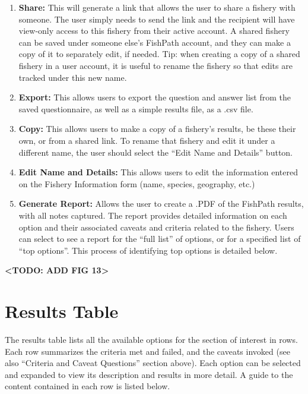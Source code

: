 \documentclass[11pt,]{book}
\providecommand{\tightlist}{%
  \setlength{\itemsep}{0pt}\setlength{\parskip}{0pt}}
\begin{document}
\begin{enumerate}
\def\labelenumi{\arabic{enumi}.}
\tightlist
\item
  \textbf{Share:} This will generate a link that allows the user to share a fishery with someone. The user simply needs to send the link and the recipient will have view-only access to this fishery from their active account. A shared fishery can be saved under someone else's FishPath account, and they can make a copy of it to separately edit, if needed. Tip: when creating a copy of a shared fishery in a user account, it is useful to rename the fishery so that edits are tracked under this new name.
\item
  \textbf{Export:} This allows users to export the question and answer list from the saved questionnaire, as well as a simple results file, as a .csv file.
\item
  \textbf{Copy:} This allows users to make a copy of a fishery's results, be these their own, or from a shared link. To rename that fishery and edit it under a different name, the user should select the ``Edit Name and Details'' button.
\item
  \textbf{Edit Name and Details:} This allows users to edit the information entered on the Fishery Information form (name, species, geography, etc.)
\item
  \textbf{Generate Report:} Allows the user to create a .PDF of the FishPath results, with all notes captured. The report provides detailed information on each option and their associated caveats and criteria related to the fishery. Users can select to see a report for the ``full list'' of options, or for a specified list of ``top options''. This process of identifying top options is detailed below.
\end{enumerate}

\textbf{\textless TODO: ADD FIG 13\textgreater{}}

\hypertarget{results-table}{%
\section{Results Table}\label{results-table}}

The results table lists all the available options for the section of interest in rows. Each row summarizes the criteria met and failed, and the caveats invoked (see also ``Criteria and Caveat Questions'' section above). Each option can be selected and expanded to view its description and results in more detail. A guide to the content contained in each row is listed below.
\end{document}
